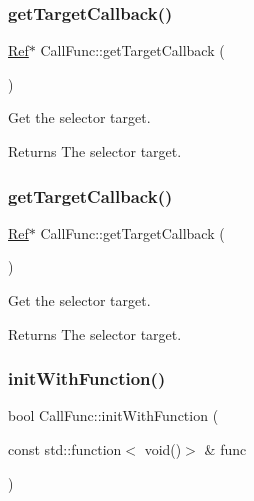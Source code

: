 \mbox{\label{classCallFunc_ae8c6ccb29a5eeb3ef076f7263628dea7}} 
\subsubsection{\texorpdfstring{get\+Target\+Callback()}{getTargetCallback()}\hspace{0.1cm}{\footnotesize\ttfamily [1/2]}}
{\footnotesize\ttfamily \hyperlink{classRef}{Ref}$\ast$ Call\+Func\+::get\+Target\+Callback (\begin{DoxyParamCaption}{ }\end{DoxyParamCaption})\hspace{0.3cm}{\ttfamily [inline]}}

Get the selector target.

\begin{DoxyReturn}{Returns}
The selector target. 
\end{DoxyReturn}
\mbox{\label{classCallFunc_ae8c6ccb29a5eeb3ef076f7263628dea7}} 
\subsubsection{\texorpdfstring{get\+Target\+Callback()}{getTargetCallback()}\hspace{0.1cm}{\footnotesize\ttfamily [2/2]}}
{\footnotesize\ttfamily \hyperlink{classRef}{Ref}$\ast$ Call\+Func\+::get\+Target\+Callback (\begin{DoxyParamCaption}{ }\end{DoxyParamCaption})\hspace{0.3cm}{\ttfamily [inline]}}

Get the selector target.

\begin{DoxyReturn}{Returns}
The selector target. 
\end{DoxyReturn}
\mbox{\label{classCallFunc_ab6ad237cb23e996abc60f35ad5091233}} 
\subsubsection{\texorpdfstring{init\+With\+Function()}{initWithFunction()}\hspace{0.1cm}{\footnotesize\ttfamily [1/2]}}
{\footnotesize\ttfamily bool Call\+Func\+::init\+With\+Function (\begin{DoxyParamCaption}\item[{const std\+::function$<$ void()$>$ \&}]{func }\end{DoxyParamCaption})}

